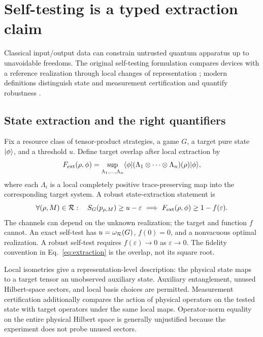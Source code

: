 \section{Self-testing is a typed extraction claim}
\label{sec:selftest}

Classical input/output data can constrain untrusted quantum apparatus up to
unavoidable freedoms. The original self-testing formulation compares devices
with a reference realization through local changes of representation
\cite{mayers2004}; modern definitions distinguish state and measurement
certification and quantify robustness \cite{supic2020}.

\subsection{State extraction and the right quantifiers}
Fix a resource class of tensor-product strategies, a game $G$, a target pure
state $\lvert \phi\rangle$, and a threshold $u$. Define target overlap after local
extraction by
\begin{equation}
 F_{\rm ext}(\rho,\phi)=
 \sup_{\Lambda_1,\ldots,\Lambda_n}
 \langle \phi\rvert(\Lambda_1\otimes\cdots\otimes\Lambda_n)(\rho)\lvert \phi\rangle,
 \label{eq:extraction}
\end{equation}
where each $\Lambda_i$ is a local completely positive trace-preserving map
into the corresponding target system. A robust state-extraction statement is
\begin{equation}
 \forall (\rho,M)\in\mathcal R:\quad
 S_G(p_{\rho,M})\geq u-\varepsilon
 \ \Longrightarrow\ F_{\rm ext}(\rho,\phi)\geq1-f(\varepsilon).
 \label{eq:robust}
\end{equation}
The channels can depend on the unknown realization; the target and function
$f$ cannot. An exact self-test has $u=\omega_{\mathcal R}(G)$, $f(0)=0$,
and a nonvacuous optimal realization. A robust self-test requires
$f(\varepsilon)\to0$ as $\varepsilon\to0$. The fidelity convention in
Eq.~\eqref{eq:extraction} is the overlap, not its square root.

Local isometries give a representation-level description:
the physical state maps to a target tensor an unobserved auxiliary state.
Auxiliary entanglement, unused Hilbert-space sectors, and local basis choices
are permitted. Measurement certification additionally compares the action of
physical operators on the tested state with target operators under the same
local maps. Operator-norm equality on the entire physical Hilbert space is
generally unjustified because the experiment does not probe unused sectors.

